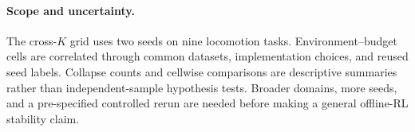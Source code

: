 \paragraph{Scope and uncertainty.}
The cross-$K$ grid uses two seeds on nine locomotion tasks. Environment--budget cells are correlated through common datasets, implementation choices, and reused seed labels. Collapse counts and cellwise comparisons are descriptive summaries rather than independent-sample hypothesis tests. Broader domains, more seeds, and a pre-specified controlled rerun are needed before making a general offline-RL stability claim.
